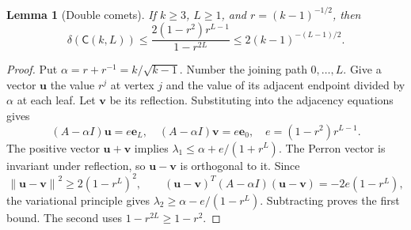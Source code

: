 \documentclass[11pt,a4paper]{article}
\numberwithin{equation}{section}
\newtheorem{lemma}[theorem]{Lemma}
\theoremstyle{definition}
\theoremstyle{remark}
\newcommand{\norm}[1]{\left\lVert#1\right\rVert}
\newcommand{\Comet}{\mathsf{C}}
\begin{document}
\begin{lemma}[Double comets]\label{bench:comet}
If $k\ge3$, $L\ge1$, and $r=(k-1)^{-1/2}$, then
\begin{equation}\label{bench:comet-bound}
 \delta(\Comet(k,L))\le
 \frac{2(1-r^2)r^{L-1}}{1-r^{2L}}
 \le2(k-1)^{-(L-1)/2}.
\end{equation}
\end{lemma}
\begin{proof}
Put $\alpha=r+r^{-1}=k/\sqrt{k-1}$. Number the joining path
$0,\ldots,L$. Give a vector $\mathbf u$ the value $r^j$ at vertex $j$
and the value of its adjacent endpoint divided by $\alpha$ at each leaf.
Let $\mathbf v$ be its reflection. Substituting into the adjacency
equations gives
\[
 (A-\alpha I)\mathbf u=e\mathbf e_L,\quad
 (A-\alpha I)\mathbf v=e\mathbf e_0,\quad
 e=(1-r^2)r^{L-1}.
\]
The positive vector $\mathbf u+\mathbf v$ implies
$\lambda_1\le\alpha+e/(1+r^L)$. The Perron vector is invariant under
reflection, so $\mathbf u-\mathbf v$ is orthogonal to it. Since
\[
 \norm{\mathbf u-\mathbf v}^2\ge2(1-r^L)^2,\qquad
 (\mathbf u-\mathbf v)^T(A-\alpha I)(\mathbf u-\mathbf v)
 =-2e(1-r^L),
\]
the variational principle gives $\lambda_2\ge\alpha-e/(1-r^L)$.
Subtracting proves the first bound. The second uses
$1-r^{2L}\ge1-r^2$.
\end{proof}
\end{document}
